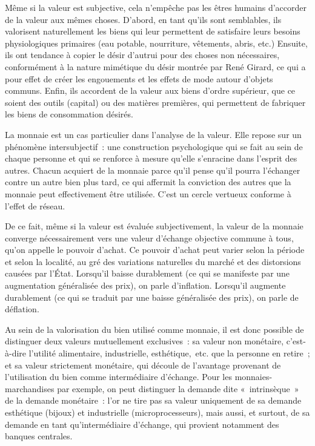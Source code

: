 Même si la valeur est subjective, cela n'empêche pas les êtres humains d'accorder de la valeur aux mêmes choses. D'abord, en tant qu'ils sont semblables, ils valorisent naturellement les biens qui leur permettent de satisfaire leurs besoins physiologiques primaires (eau potable, nourriture, vêtements, abris, etc.) Ensuite, ils ont tendance à copier le désir d'autrui pour des choses non nécessaires, conformément à la nature mimétique du désir montrée par René Girard, ce qui a pour effet de créer les engouements et les effets de mode autour d'objets communs. Enfin, ils accordent de la valeur aux biens d'ordre supérieur, que ce soient des outils (capital) ou des matières premières, qui permettent de fabriquer les biens de consommation désirés.


La monnaie est un cas particulier dans l'analyse de la valeur. Elle repose sur un phénomène intersubjectif~: une construction psychologique qui se fait au sein de chaque personne et qui se renforce à mesure qu'elle s'enracine dans l'esprit des autres. Chacun acquiert de la monnaie parce qu'il pense qu'il pourra l'échanger contre un autre bien plus tard, ce qui affermit la conviction des autres que la monnaie peut effectivement être utilisée. C'est un cercle vertueux conforme à l'effet de réseau.

De ce fait, même si la valeur est évaluée subjectivement, la valeur de la monnaie converge nécessairement vers une valeur d'échange objective commune à tous, qu'on appelle le pouvoir d'achat. Ce pouvoir d'achat peut varier selon la période et selon la localité, au gré des variations naturelles du marché et des distorsions causées par l'État. Lorsqu'il baisse durablement (ce qui se manifeste par une augmentation généralisée des prix), on parle d'inflation. Lorsqu'il augmente durablement (ce qui se traduit par une baisse généralisée des prix), on parle de déflation.

Au sein de la valorisation du bien utilisé comme monnaie, il est donc possible de distinguer deux valeurs mutuellement exclusives~: sa valeur non monétaire, c'est-à-dire l'utilité alimentaire, industrielle, esthétique,~etc. que la personne en retire~; et sa valeur strictement monétaire, qui découle de l'avantage provenant de l'utilisation du bien comme intermédiaire d'échange. Pour les monnaies-marchandises par exemple, on peut distinguer la demande dite «~intrinsèque~» de la demande monétaire~: l'or ne tire pas sa valeur uniquement de sa demande esthétique (bijoux) et industrielle (microprocesseurs), mais aussi, et surtout, de sa demande en tant qu'intermédiaire d'échange, qui provient notamment des banques centrales.

